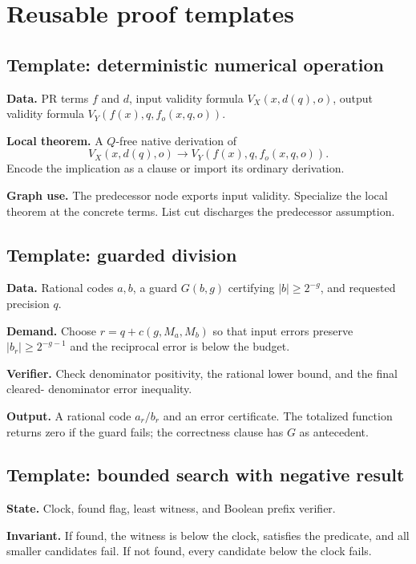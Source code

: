 \section{Reusable proof templates}

\subsection{Template: deterministic numerical operation}

\textbf{Data.}
PR terms \(f\) and \(d\), input validity formula \(V_X(x,d(q),o)\), output
validity formula \(V_Y(f(x),q,f_o(x,q,o))\).

\textbf{Local theorem.}
A \(Q\)-free native derivation of
\[
    V_X(x,d(q),o)\to V_Y(f(x),q,f_o(x,q,o)).
\]
Encode the implication as a clause or import its ordinary derivation.

\textbf{Graph use.}
The predecessor node exports input validity.  Specialize the local theorem at
the concrete terms.  List cut discharges the predecessor assumption.

\subsection{Template: guarded division}

\textbf{Data.}
Rational codes \(a,b\), a guard \(G(b,g)\) certifying
\(|b|\ge2^{-g}\), and requested precision \(q\).

\textbf{Demand.}
Choose \(r=q+c(g,M_a,M_b)\) so that input errors preserve
\(|b_r|\ge2^{-g-1}\) and the reciprocal error is below the budget.

\textbf{Verifier.}
Check denominator positivity, the rational lower bound, and the final cleared-
denominator error inequality.

\textbf{Output.}
A rational code \(a_r/b_r\) and an error certificate.  The totalized function
returns zero if the guard fails; the correctness clause has \(G\) as
antecedent.

\subsection{Template: bounded search with negative result}

\textbf{State.}
Clock, found flag, least witness, and Boolean prefix verifier.

\textbf{Invariant.}
If found, the witness is below the clock, satisfies the predicate, and all
smaller candidates fail.  If not found, every candidate below the clock fails.

